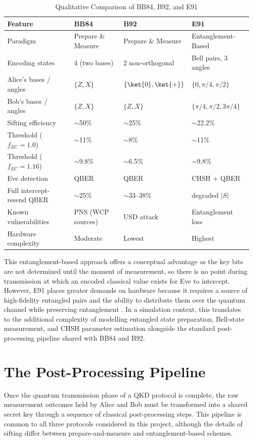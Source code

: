 \begin{table}[h]
\centering
\caption{Qualitative Comparison of BB84, B92, and E91}
\label{tab:protocol-comparison}
\footnotesize
\begin{tabularx}{\linewidth}{@{}l X X X@{}}
\toprule
\textbf{Feature} & \textbf{BB84} & \textbf{B92} & \textbf{E91} \\
\midrule
Paradigm & Prepare \& Measure & Prepare \& Measure & Entanglement-Based \\
Encoding states & 4 (two bases) & 2 non-orthogonal & Bell pairs, 3 angles \\
Alice's bases / angles & $\{Z, X\}$ & $\{\ket{0}, \ket{+}\}$ & $\{0, \pi/4, \pi/2\}$ \\
Bob's bases / angles & $\{Z, X\}$ & $\{Z, X\}$ & $\{\pi/4, \pi/2, 3\pi/4\}$ \\
Sifting efficiency & $\sim$50\% & $\sim$25\% & $\sim$22.2\% \\
Threshold ($f_{EC}\!=\!1.0$) & $\sim$11\% & $\sim$8\% & $\sim$11\% \\
Threshold ($f_{EC}\!=\!1.16$) & $\sim$9.8\% & $\sim$6.5\% & $\sim$9.8\% \\
Eve detection & QBER & QBER & CHSH $+$ QBER \\
Full intercept-resend QBER & $\sim$25\% & $\sim$33--38\% & degraded $|S|$ \\
Known vulnerabilities & PNS (WCP sources) & USD attack & Entanglement loss \\
Hardware complexity & Moderate & Lowest & Highest \\
\bottomrule
\end{tabularx}
\end{table}

This entanglement-based approach offers a conceptual advantage as the key bits are not determined until the moment of measurement, so there is no point during transmission at which an encoded classical value exists for Eve to intercept. However, E91 places greater demands on hardware because it requires a source of high-fidelity entangled pairs and the ability to distribute them over the quantum channel while preserving entanglement \cite{ekertQI}. In a simulation context, this translates to the additional complexity of modelling entangled state preparation, Bell-state measurement, and CHSH parameter estimation alongside the standard post-processing pipeline shared with BB84 and B92.



\section{The Post-Processing Pipeline}
Once the quantum transmission phase of a QKD protocol is complete, the raw measurement outcomes held by Alice and Bob must be transformed into a shared secret key through a sequence of classical post-processing steps. This pipeline is common to all three protocols considered in this project, although the details of sifting differ between prepare-and-measure and entanglement-based schemes.

